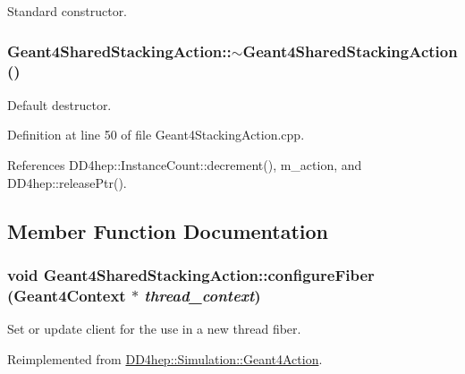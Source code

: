 Standard constructor. \hypertarget{class_d_d4hep_1_1_simulation_1_1_geant4_shared_stacking_action_a0cfbf0ceed945aff6b837df8fd5459c7}{
\subsubsection[{$\sim$Geant4SharedStackingAction}]{\setlength{\rightskip}{0pt plus 5cm}Geant4SharedStackingAction::$\sim$Geant4SharedStackingAction ()}}
\label{class_d_d4hep_1_1_simulation_1_1_geant4_shared_stacking_action_a0cfbf0ceed945aff6b837df8fd5459c7}


Default destructor. 

Definition at line 50 of file Geant4StackingAction.cpp.

References DD4hep::InstanceCount::decrement(), m\_\-action, and DD4hep::releasePtr().

\subsection{Member Function Documentation}
\hypertarget{class_d_d4hep_1_1_simulation_1_1_geant4_shared_stacking_action_af204c8b8ed06b5ac14c168ea639c51ac}{
\subsubsection[{configureFiber}]{\setlength{\rightskip}{0pt plus 5cm}void Geant4SharedStackingAction::configureFiber ({\bf Geant4Context} $\ast$ {\em thread\_\-context})}}
\label{class_d_d4hep_1_1_simulation_1_1_geant4_shared_stacking_action_af204c8b8ed06b5ac14c168ea639c51ac}


Set or update client for the use in a new thread fiber. 

Reimplemented from \hyperlink{class_d_d4hep_1_1_simulation_1_1_geant4_action_a6adc7138508303e4e417cb48a737ab19}{DD4hep::Simulation::Geant4Action}.

